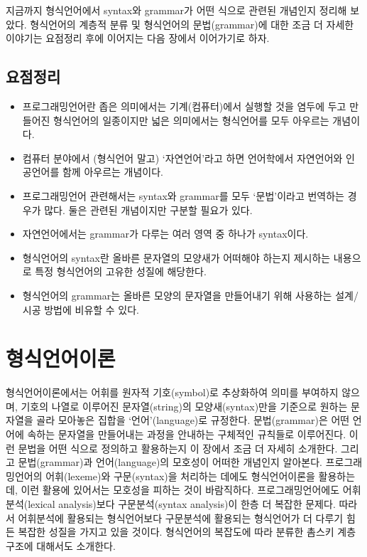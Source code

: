 지금까지 형식언어에서 syntax와 grammar가 어떤 식으로 관련된 개념인지 정리해 보았다.
형식언어의 계층적 분류 및 형식언어의 문법(grammar)에 대한 조금 더 자세한 이야기는
요점정리 후에 이어지는 다음 장에서 이어가기로 하자.

\section*{요점정리}
\begin{itemize}[itemsep=0pt]
    \item 프로그래밍언어란 좁은 의미에서는 기계(컴퓨터)에서 실행할 것을
    염두에 두고 만들어진 형식언어의 일종이지만 넓은 의미에서는 형식언어를
    모두 아우르는 개념이다.
    \item
    컴퓨터 분야에서 (형식언어 말고) `자연언어'라고 하면
    언어학에서 자연언어와 인공언어를 함께 아우르는 개념이다.
    \item
    프로그래밍언어 관련해서는 syntax와 grammar를 모두 `문법'이라고
    번역하는 경우가 많다. 둘은 관련된 개념이지만 구분할 필요가 있다.
    \item
    자연언어에서는 grammar가 다루는 여러 영역 중 하나가 syntax이다.
    \item
    형식언어의 syntax란 올바른 문자열의 모양새가 어떠해야 하는지 제시하는
    내용으로 특정 형식언어의 고유한 성질에 해당한다.
    \item
    형식언어의 grammar는 올바른 모양의 문자열을 만들어내기 위해
    사용하는 설계/시공 방법에 비유할 수 있다.
\end{itemize}


\chapter{형식언어이론}
형식언어이론에서는 어휘를 원자적 기호(symbol)로 추상화하여 의미를 부여하지 않으며,
기호의 나열로 이루어진 문자열(string)의 모양새(syntax)만을 기준으로 원하는 문자열을
골라 모아놓은 집합을 `언어'(language)로 규정한다. 문법(grammar)은 어떤 언어에 속하는
문자열을 만들어내는 과정을 안내하는 구체적인 규칙들로 이루어진다. 이런 문법을
어떤 식으로 정의하고 활용하는지 이 장에서 조금 더 자세히 소개한다. 그리고
문법(grammar)과 언어(language)의 모호성이 어떠한 개념인지 알아본다.
프로그래밍언어의 어휘(lexeme)와 구문(syntax)을 처리하는 데에도 형식언어이론을
활용하는데, 이런 활용에 있어서는 모호성을 피하는 것이 바람직하다.
프로그래밍언어에도 어휘분석(lexical analysis)보다 구문분석(syntax analysis)이
한층 더 복잡한 문제다. 따라서 어휘분석에 활용되는 형식언어보다 구문분석에 
활용되는 형식언어가 더 다루기 힘든 복잡한 성질을 가지고 있을 것이다.
형식언어의 복잡도에 따라 분류한 촘스키 계층 구조에 대해서도 소개한다.

